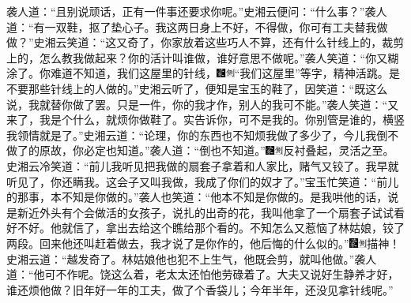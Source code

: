 袭人道：``且别说顽话，正有一件事还要求你呢。''史湘云便问：``什么事？''袭人道：``有一双鞋，抠了垫心子。我这两日身上不好，不得做，你可有工夫替我做做？''史湘云笑道：``这又奇了，你家放着这些巧人不算，还有什么针线上的，裁剪上的，怎么教我做起来？你的活计叫谁做，谁好意思不做呢。''袭人笑道：``你又糊涂了。你难道不知道，我们这屋里的针线，{\includegraphics[width=3mm]{../Images/00006}\includegraphics[width=3mm]{../Images/00011}\footnotesize \kaishu ``我们这屋里''等字，精神活跳。}是不要那些针线上的人做的。''史湘云听了，便知是宝玉的鞋了，因笑道：``既这么说，我就替你做了罢。只是一件，你的我才作，别人的我可不能。''袭人笑道：``又来了，我是个什么，就烦你做鞋了。实告诉你，可不是我的。你别管是谁的，横竖我领情就是了。''史湘云道：``论理，你的东西也不知烦我做了多少了，今儿我倒不做了的原故，你必定也知道。''袭人道：``倒也不知道。''{\includegraphics[width=3mm]{../Images/00006}\includegraphics[width=3mm]{../Images/00011}\footnotesize \kaishu 反衬叠起，灵活之至。}史湘云冷笑道：``前儿我听见把我做的扇套子拿着和人家比，赌气又铰了。我早就听见了，你还瞒我。这会子又叫我做，我成了你们的奴才了。''宝玉忙笑道：``前儿的那事，本不知是你做的。''袭人也笑道：``他本不知是你做的。是我哄他的话，说是新近外头有个会做活的女孩子，说扎的出奇的花，我叫他拿了一个扇套子试试看好不好。他就信了，拿出去给这个瞧给那个看的。不知怎么又惹恼了林姑娘，铰了两段。回来他还叫赶着做去，我才说了是你作的，他后悔的什么似的。''{\includegraphics[width=3mm]{../Images/00006}\includegraphics[width=3mm]{../Images/00011}\footnotesize \kaishu 描神！}史湘云道：``越发奇了。林姑娘他也犯不上生气，他既会剪，就叫他做。''袭人道：``他可不作呢。饶这么着，老太太还怕他劳碌着了。大夫又说好生静养才好，谁还烦他做？旧年好一年的工夫，做了个香袋儿；今年半年，还没见拿针线呢。''

